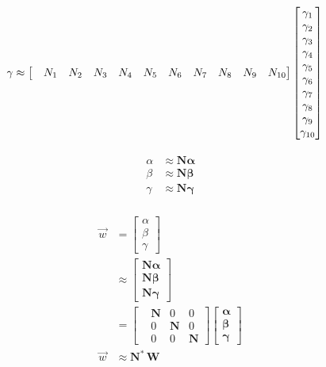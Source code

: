 \documentclass{article}
\begin{document}
\begin{align}
\vspace{10mm} %
        \gamma &\approx
        \setcounter{MaxMatrixCols}{11}
        \begin{bmatrix}
        &N_1 &N_2 &N_3 &N_4 &N_5 &N_6 &N_7 &N_8 &N_9 &N_{10}
        \end{bmatrix}
        \setcounter{MaxMatrixCols}{11}
        \begin{bmatrix}
        \gamma_1 \\
        \gamma_2 \\
        \gamma_3 \\
        \gamma_4 \\
        \gamma_5 \\
        \gamma_6 \\
        \gamma_7 \\
        \gamma_8 \\
        \gamma_9 \\
        \gamma_{10}
        \end{bmatrix}
\end{align}

\begin{align}
    \begin{split}
        \alpha &\approx 
        \mathbf{N}\boldsymbol{\alpha}\\
        \beta &\approx
        \mathbf{N}\boldsymbol{\beta}\\
        \gamma &\approx
        \mathbf{N}\boldsymbol{\gamma}
    \end{split}
\end{align}

\begin{align}
\begin{split}
    \vec{w}&=
    \begin{bmatrix}
    \alpha \\ \beta \\ \gamma
    \end{bmatrix} \\
    &\approx
    \begin{bmatrix}
    \mathbf{N}\boldsymbol{\alpha} \\ \mathbf{N}\boldsymbol{\beta} \\ \mathbf{N}\boldsymbol{\gamma}
    \end{bmatrix} \\
    &=
    \begin{bmatrix}
    &\mathbf{N} &0 &0\\
    &0 &\mathbf{N} &0\\
    &0 &0 &\mathbf{N}
    \end{bmatrix}
    \begin{bmatrix}
    \boldsymbol{\alpha} \\ \boldsymbol{\beta} \\ \boldsymbol{\gamma}
    \end{bmatrix} \\
    \vec{w}&\approx \mathbf{N}^*\,\mathbf{W}
\end{split}
\end{align}
\end{document}
